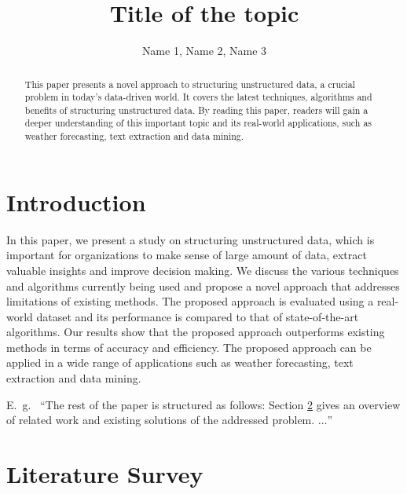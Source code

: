 \documentclass[]{tukseminar}
\title{Title of the topic}
\author{Name 1, Name 2, Name 3
  \institute{Technische Universität Kaiserslautern, Department of Computer Science}}
\begin{document}

\maketitle


\begin{abstract}
    This paper presents a novel approach to structuring unstructured data, a crucial problem in today's data-driven world. It covers the latest techniques, algorithms and benefits of structuring unstructured data. By reading this paper, readers will gain a deeper understanding of this important topic and its real-world applications, such as weather forecasting, text extraction and data mining.
\end{abstract}


\section{Introduction}
\label{sec:introduction}

In this paper, we present a study on structuring unstructured data, which is important for organizations to make sense of large amount of data, extract valuable insights and improve decision making. We discuss the various techniques and algorithms currently being used and propose a novel approach that addresses limitations of existing methods. The proposed approach is evaluated using a real-world dataset and its performance is compared to that of state-of-the-art algorithms. Our results show that the proposed approach outperforms existing methods in terms of accuracy and efficiency. The proposed approach can be applied in a wide range of applications such as weather forecasting, text extraction and data mining.

E.~g.~ ``The rest of the paper is structured as follows:
Section \ref{sec:literatureSurvey} gives an overview of related work and existing solutions of the addressed problem. $\ldots$''

\section{Literature Survey}
\label{sec:literatureSurvey}
\end{document}
